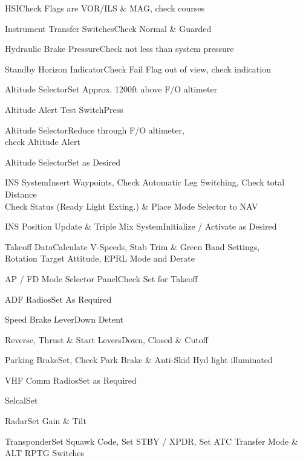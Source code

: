 \documentclass[sim-use, blue_items]{checklist}
\begin{document}
\begin{continuedchecklist}
	\item{HSI}{Check Flags are VOR/ILS \& MAG, check courses}
	\item{Instrument Transfer Switches}{Check Normal \& Guarded}
	\item{Hydraulic Brake Pressure}{Check not less than system pressure}
	\item{Standby Horizon Indicator}{Check Fail Flag out of view, check indication}
	 {
		\item{Altitude Selector}{Set Approx. 1200ft above F/O altimeter}
		\item{Altitude Alert Test Switch}{Press}
		\item{Altitude Selector}{Reduce through F/O altimeter,\\check Altitude Alert}
		\item{Altitude Selector}{Set as Desired}
	}
	\item{INS System}{Insert Waypoints, Check Automatic Leg Switching, Check total Distance\\Check Status (Ready Light Exting.) \& Place Mode Selector to NAV}
	\item{INS Position Update \& Triple Mix System}{Initialize / Activate as Desired}
	\item{Takeoff Data}{Calculate V-Speeds, Stab Trim \& Green Band Settings,\\Rotation Target Attitude, EPRL Mode and Derate}
	\item{AP / FD Mode Selector Panel}{Check Set for Takeoff}
	\item{ADF Radios}{Set As Required}
	\item{Speed Brake Lever}{Down Detent}
	\item{Reverse, Thrust \& Start Levers}{Down, Closed \& Cutoff}
	\item{Parking Brake}{Set, Check Park Brake \& Anti-Skid Hyd light illuminated}
	\item{VHF Comm Radios}{Set as Required}
	\item{Selcal}{Set}
	\item{Radar}{Set Gain \& Tilt}
	\item{Transponder}{Set Squawk Code, Set STBY / XPDR, Set ATC Transfer Mode \& ALT RPTG Switches}
\end{continuedchecklist}
\end{document}
